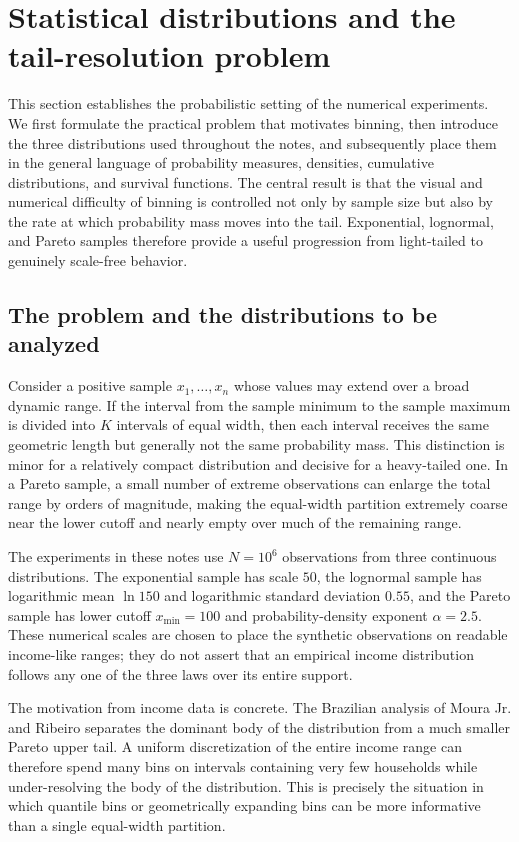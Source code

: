 \section{Statistical distributions and the tail-resolution problem}

This section establishes the probabilistic setting of the numerical experiments. We first formulate the practical problem that motivates binning, then introduce the three distributions used throughout the notes, and subsequently place them in the general language of probability measures, densities, cumulative distributions, and survival functions. The central result is that the visual and numerical difficulty of binning is controlled not only by sample size but also by the rate at which probability mass moves into the tail. Exponential, lognormal, and Pareto samples therefore provide a useful progression from light-tailed to genuinely scale-free behavior.

\subsection{The problem and the distributions to be analyzed}

Consider a positive sample $x_1,\ldots,x_n$ whose values may extend over a broad dynamic range. If the interval from the sample minimum to the sample maximum is divided into $K$ intervals of equal width, then each interval receives the same geometric length but generally not the same probability mass. This distinction is minor for a relatively compact distribution and decisive for a heavy-tailed one. In a Pareto sample, a small number of extreme observations can enlarge the total range by orders of magnitude, making the equal-width partition extremely coarse near the lower cutoff and nearly empty over much of the remaining range.

The experiments in these notes use $N=10^6$ observations from three continuous distributions. The exponential sample has scale $50$, the lognormal sample has logarithmic mean $\ln 150$ and logarithmic standard deviation $0.55$, and the Pareto sample has lower cutoff $x_{\min}=100$ and probability-density exponent $\alpha=2.5$. These numerical scales are chosen to place the synthetic observations on readable income-like ranges; they do not assert that an empirical income distribution follows any one of the three laws over its entire support.

The motivation from income data is concrete. The Brazilian analysis of Moura Jr. and Ribeiro \cite{MouraRibeiro2009} separates the dominant body of the distribution from a much smaller Pareto upper tail. A uniform discretization of the entire income range can therefore spend many bins on intervals containing very few households while under-resolving the body of the distribution. This is precisely the situation in which quantile bins or geometrically expanding bins can be more informative than a single equal-width partition.

